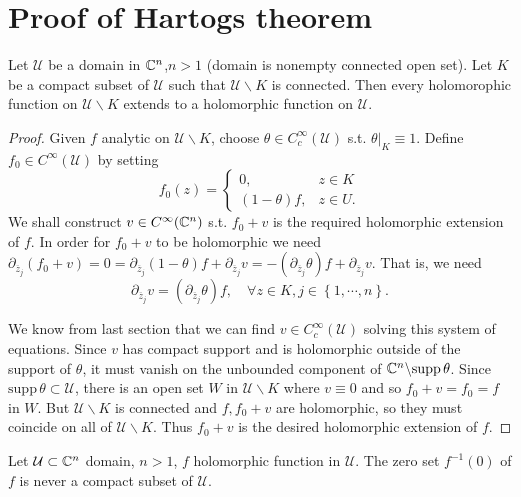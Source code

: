 \section{Proof of Hartogs theorem}
\begin{theorem}
  Let $\mathcal{U}$ be a domain in $\mathbb{C}^{n}$,$n>1$ (domain is nonempty connected open set). Let $K$ be a compact subset of $\mathcal{U}$ such that $\mathcal{U}\backslash K$ is connected. Then every holomorophic function on $\mathcal{U}\backslash  K$ extends to a holomorphic function on $\mathcal{U}$.
\end{theorem}
\begin{proof}
  Given $f$ analytic on $\mathcal{U}\backslash  K$, choose $\theta \in  C_c^{\infty}(\mathcal{U})$ s.t. $\theta|_K\equiv 1$. Define $f_0\in C^{\infty}\left( \mathcal{U} \right) $ by setting 
  \[
    f_0(z)=\begin{cases}
      0,&z\in K\\
      (1-\theta)f, &z \in U.
    \end{cases}
  \]
  We shall construct $v \in C^{\infty}(\mathbb{C}^{n})$ s.t.  $f_0+v$ is the required holomorphic extension of $f$. In order for $f_0+v$ to be holomorphic we need $\partial_{\overline{z}_j}(f_0+v)=0=\partial_{\overline{z}_j}(1-\theta)f+\partial_{\overline{z}_j}v=-(\partial_{\overline{z}_j}\theta )f+\partial_{\overline{z}_j}v$. That is, we need 
  \[
    \partial_{\overline{z}_j}v=\left( \partial_{\overline{z}_j}\theta \right) f,\quad \forall z\in K, j\in \left\{1,\cdots ,n\right\} .
  \]

  We know from last section that we can find $v\in C_c^{\infty}(\mathcal{U})$ solving this system of equations.
  Since $v$ has compact support and is holomorphic outside of the support of $\theta$, it must vanish on the unbounded component of $\mathbb{C}^{n}\backslash \mathrm{supp}\,\theta$. Since $\mathrm{supp}\,\theta\subset \mathcal{U}$, there is an open set $W$ in $\mathcal{U}\backslash  K$ where $v\equiv 0$ and so $f_0+v= f_0=f$ in $W$. But $\mathcal{U}\backslash K$ is connected and $f,f_0+v$ are holomorphic, so they must coincide on all of $\mathcal{U}\backslash K$. Thus $f_0+v$ is the desired holomorphic extension of $f$.
\end{proof}
\begin{corollary}
  Let $\mathcal{U}\subset \mathbb{C}^{n}$ domain, $n>1$, $f$ holomorphic function in $\mathcal{U}$. The zero set $f^{-1}(0)$ of $f$ is never a compact subset of $\mathcal{U}$.
\end{corollary}
